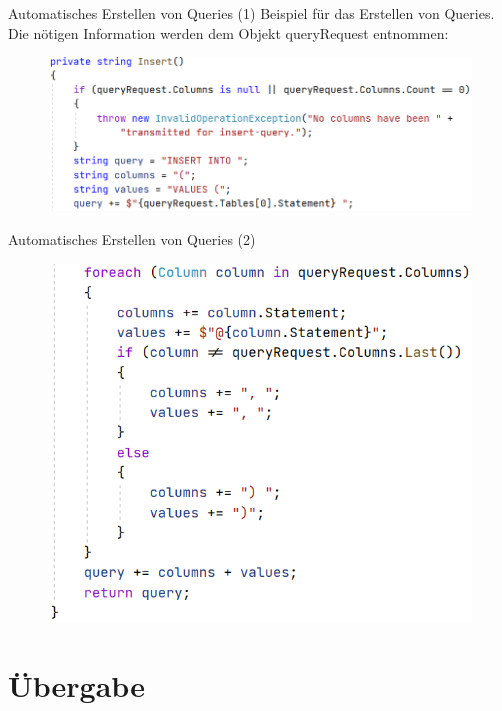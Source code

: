 \documentclass[toc]{beamer}
\begin{document}
        \begin{frame}{Automatisches Erstellen von Queries (1)}
            Beispiel für das Erstellen von Queries. Die nötigen Information werden dem Objekt \glqq queryRequest\grqq{} entnommen:
            \begin{figure}[htp]
                \includegraphics[scale=0.37,left]{insert0.PNG}
            \end{figure}
        \end{frame}
        
        \begin{frame}{Automatisches Erstellen von Queries (2)}
            \begin{figure}[htp]
                \includegraphics[scale=0.36,left]{insert_crop.PNG}
            \end{figure}
        \end{frame}
        
\section{Übergabe}
\end{document}
